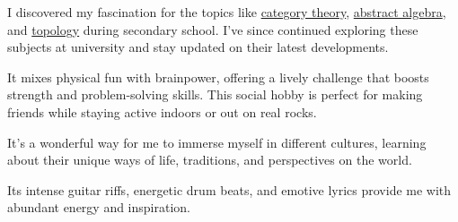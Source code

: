 
\begin{cvhonors}

	{I discovered my fascination for the topics like \href{https://en.wikipedia.org/wiki/Category_theory}{category theory}, \href{https://en.wikipedia.org/wiki/Abstract_algebra}{abstract algebra}, and \href{https://en.wikipedia.org/wiki/Topology}{topology} during secondary school. I've since continued exploring these subjects at university and stay updated on their latest developments.}
	{}
	{}

	{It mixes physical fun with brainpower, offering a lively challenge that boosts strength and problem-solving skills. This social hobby is perfect for making friends while staying active indoors or out on real rocks.}
	{}
	{}

	{It's a wonderful way for me to immerse myself in different cultures, learning about their unique ways of life, traditions, and perspectives on the world.}
	{}
	{}

	{Its intense guitar riffs, energetic drum beats, and emotive lyrics provide me with abundant energy and inspiration.}
	{}
	{}

\end{cvhonors}
